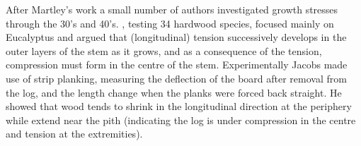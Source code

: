 After Martley's work a small number of authors investigated growth stresses
through the 30's and 40's. \cite{jacobs1945l}, testing 34 hardwood species, focused
mainly on Eucalyptus and argued that (longitudinal) tension successively
develops in the outer layers of the stem as it grows, and as a consequence of
the tension, compression must form in the centre of the stem. 
Experimentally Jacobs made use of strip planking, measuring the deflection of
the board after removal from the log, and the length change when the planks were
forced back straight. He showed that wood tends to shrink in the longitudinal
direction at the periphery while extend near the pith (indicating the log
is under compression in the centre and tension at the extremities).
